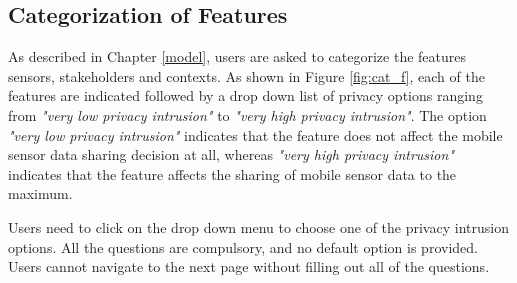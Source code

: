 \subsection{Categorization of Features} \label{cat_feature}

As described in Chapter \ref{model}, users are asked to categorize the features sensors, stakeholders and contexts. As shown in Figure 
\ref{fig:cat_f}, each of the features are indicated followed by a drop down list of privacy options ranging from \textit{"very low privacy intrusion"} to \textit{"very high privacy intrusion"}. The option \textit{"very low privacy intrusion"} indicates that the feature does not affect the mobile sensor data sharing decision at all, whereas 
\textit{"very high privacy intrusion"} indicates that the feature affects the sharing of mobile sensor data to the maximum. 

Users need to click on the
drop down menu to choose one of the privacy intrusion options. All the questions are compulsory, and no default option is provided. Users cannot navigate to the next page without filling out all of the questions.

